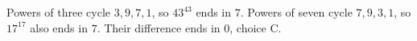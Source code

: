 Powers of three cycle $3,9,7,1$, so $43^{43}$ ends in $7$. Powers of seven cycle $7,9,3,1$, so $17^{17}$ also ends in $7$. Their difference ends in $\boxed 0$, choice C.
